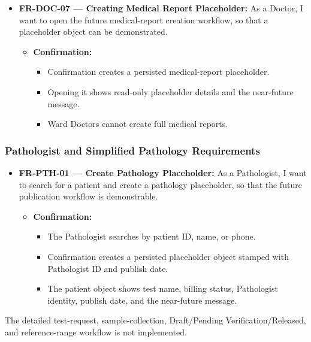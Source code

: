\documentclass[11pt,a4paper]{article}
\begin{document}
\begin{itemize}
    \item \textbf{FR-DOC-07 — Creating Medical Report Placeholder:} As a Doctor, I want to open the future medical-report creation workflow, so that a placeholder object can be demonstrated.
    \begin{itemize}
        \item \textbf{Confirmation:}
        \begin{itemize}
            \item Confirmation creates a persisted medical-report placeholder.
            \item Opening it shows read-only placeholder details and the near-future message.
            \item Ward Doctors cannot create full medical reports.
        \end{itemize}
    \end{itemize}
\end{itemize}

\subsubsection{Pathologist and Simplified Pathology Requirements}

\begin{itemize}
    \item \textbf{FR-PTH-01 — Create Pathology Placeholder:} As a Pathologist, I want to search for a patient and create a pathology placeholder, so that the future publication workflow is demonstrable.
    \begin{itemize}
        \item \textbf{Confirmation:}
        \begin{itemize}
            \item The Pathologist searches by patient ID, name, or phone.
            \item Confirmation creates a persisted placeholder object stamped with Pathologist ID and publish date.
            \item The patient object shows test name, billing status, Pathologist identity, publish date, and the near-future message.
        \end{itemize}
    \end{itemize}
\end{itemize}

The detailed test-request, sample-collection, Draft/Pending Verification/Released, and reference-range workflow is not implemented.
\end{document}
